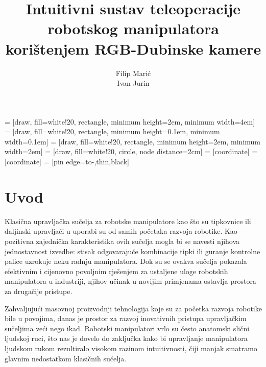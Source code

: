 \documentclass[times, utf8, diplomski, numeric]{fer}
\begin{document}
\renewcommand{\labelitemi}{$\bullet$}
 = [draw, fill=white!20, rectangle,
    minimum height=2em, minimum width=4em]
 = [draw, fill=white!20, rectangle, 
    minimum height=0.1em, minimum width=0.1em]    
 = [draw, fill=white!20, rectangle, 
    minimum height=2em, minimum width=2em]
 = [draw, fill=white!20, circle, node distance=2cm]
 = [coordinate]
 = [coordinate]
 = [pin edge={to-,thin,black}]


\title{Intuitivni sustav teleoperacije robotskog manipulatora korištenjem RGB-Dubinske kamere}

\author{Filip Marić \\ Ivan Jurin}

\maketitle


\tableofcontents

\chapter{Uvod}
Klasična upravljačka sučelja za robotske manipulatore kao što su tipkovnice ili daljinski upravljači u uporabi su od samih početaka razvoja robotike.
Kao pozitivna zajednička karakteristika ovih sučelja mogla bi se navesti njihova jednostavnost izvedbe: stisak odgovarajuće kombinacije tipki ili guranje kontrolne palice uzrokuje neku radnju manipulatora.
Dok su se ovakva sučelja pokazala efektivnim i cijenovno povoljnim rješenjem za ustaljene uloge robotskih manipulatora u industriji, njihov učinak u novijim primjenama ostavlja prostora za drugačije pristupe.

Zahvaljujući masovnoj proizvodnji tehnologija koje su za početka razvoja robotike bile u povojima, danas je prostor za razvoj inovativnih pristupa upravljačkim sučeljima veći nego ikad.
Robotski manipulatori vrlo su često anatomski slični ljudskoj ruci, što nas je dovelo do zaključka kako bi upravljanje manipulatora ljudskom rukom rezultiralo visokom razinom intuitivnosti, čiji manjak smatramo glavnim nedostatkom klasičnih sučelja.
\end{document}
